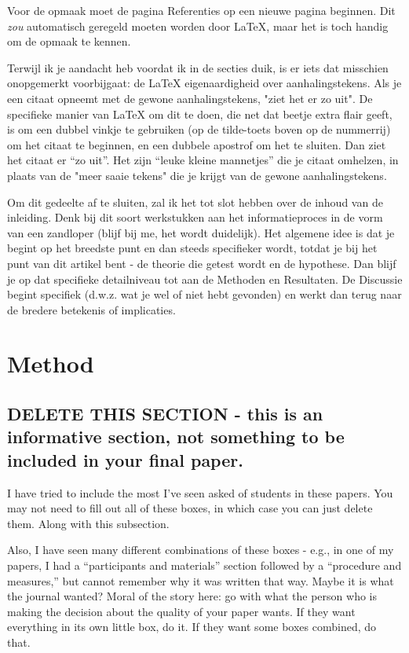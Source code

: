\documentclass[stu,12pt,floatsintext]{apa7}
\begin{document}
Voor de opmaak moet de pagina Referenties op een nieuwe pagina beginnen. Dit \textit{zou} automatisch geregeld moeten worden door \LaTeX{}, maar het is toch handig om de opmaak te kennen.

Terwijl ik je aandacht heb voordat ik in de secties duik, is er iets dat misschien onopgemerkt voorbijgaat: de \LaTeX{} eigenaardigheid over aanhalingstekens. 
Als je een citaat opneemt met de gewone aanhalingstekens, "ziet het er zo uit". 
De specifieke manier van \LaTeX{} om dit te doen, die net dat beetje extra flair geeft, is om een dubbel vinkje te gebruiken (op de tilde-toets boven op de nummerrij) om het citaat te beginnen, en een dubbele apostrof om het te sluiten. Dan ziet het citaat er ``zo uit''. 
Het zijn ``leuke kleine mannetjes'' die je citaat omhelzen, in plaats van de "meer saaie tekens" die je krijgt van de gewone aanhalingstekens.

Om dit gedeelte af te sluiten, zal ik het tot slot hebben over de inhoud van de inleiding. Denk bij dit soort werkstukken aan het informatieproces in de vorm van een zandloper (blijf bij me, het wordt duidelijk). Het algemene idee is dat je begint op het breedste punt en dan steeds specifieker wordt, totdat je bij het punt van dit artikel bent - de theorie die getest wordt en de hypothese. 
Dan blijf je op dat specifieke detailniveau tot aan de Methoden en Resultaten. 
De Discussie begint specifiek (d.w.z. wat je wel of niet hebt gevonden) en werkt dan terug naar de bredere betekenis of implicaties.

\section{Method}

\subsection{DELETE THIS SECTION - this is an informative section, not something to be included in your final paper.}

I have tried to include the most I've seen asked of students in these papers. You may not need to fill out all of these boxes, in which case you can just delete them. Along with this subsection.

Also, I have seen many different combinations of these boxes - e.g., in one of my papers, I had a ``participants and materials'' section followed by a ``procedure and measures,'' but cannot remember why it was written that way. Maybe it is what the journal wanted? Moral of the story here: go with what the person who is making the decision about the quality of your paper wants. If they want everything in its own little box, do it. If they want some boxes combined, do that.
\end{document}

